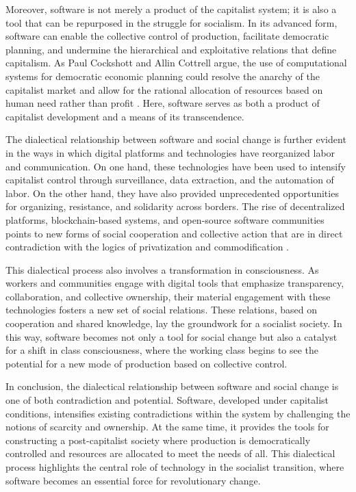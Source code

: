 \begin{refsection}
Moreover, software is not merely a product of the capitalist system; it is also a tool that can be repurposed in the struggle for socialism. In its advanced form, software can enable the collective control of production, facilitate democratic planning, and undermine the hierarchical and exploitative relations that define capitalism. As Paul Cockshott and Allin Cottrell argue, the use of computational systems for democratic economic planning could resolve the anarchy of the capitalist market and allow for the rational allocation of resources based on human need rather than profit \cite[pp.~54-56]{cockshott1993}. Here, software serves as both a product of capitalist development and a means of its transcendence.

The dialectical relationship between software and social change is further evident in the ways in which digital platforms and technologies have reorganized labor and communication. On one hand, these technologies have been used to intensify capitalist control through surveillance, data extraction, and the automation of labor. On the other hand, they have also provided unprecedented opportunities for organizing, resistance, and solidarity across borders. The rise of decentralized platforms, blockchain-based systems, and open-source software communities points to new forms of social cooperation and collective action that are in direct contradiction with the logics of privatization and commodification \cite[pp.~105-108]{benkler2006}.

This dialectical process also involves a transformation in consciousness. As workers and communities engage with digital tools that emphasize transparency, collaboration, and collective ownership, their material engagement with these technologies fosters a new set of social relations. These relations, based on cooperation and shared knowledge, lay the groundwork for a socialist society. In this way, software becomes not only a tool for social change but also a catalyst for a shift in class consciousness, where the working class begins to see the potential for a new mode of production based on collective control.

In conclusion, the dialectical relationship between software and social change is one of both contradiction and potential. Software, developed under capitalist conditions, intensifies existing contradictions within the system by challenging the notions of scarcity and ownership. At the same time, it provides the tools for constructing a post-capitalist society where production is democratically controlled and resources are allocated to meet the needs of all. This dialectical process highlights the central role of technology in the socialist transition, where software becomes an essential force for revolutionary change.


\end{refsection}
